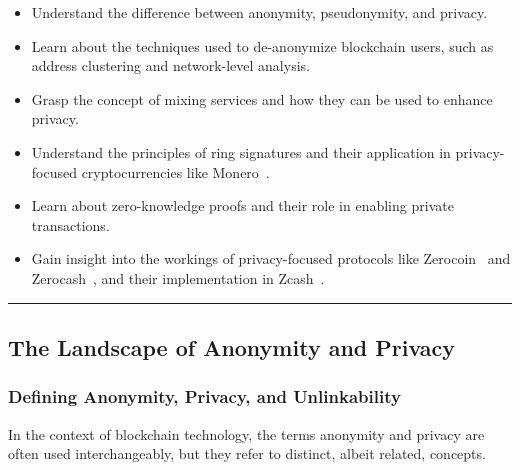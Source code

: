 \begin{itemize}
\tightlist
\item
  Understand the difference between anonymity, pseudonymity, and
  privacy.
\item
  Learn about the techniques used to de-anonymize blockchain users, such
  as address clustering and network-level analysis.
\item
  Grasp the concept of mixing services and how they can be used to
  enhance privacy.
\item
  Understand the principles of ring signatures and their application in
  privacy-focused cryptocurrencies like Monero~\cite{moser2017empirical}.
\item
  Learn about zero-knowledge proofs and their role in enabling private
  transactions.
\item
  Gain insight into the workings of privacy-focused protocols like
  Zerocoin~\cite{miers2013zerocoin} and Zerocash~\cite{sasson2014zerocash}, and their implementation in Zcash~\cite{kappos2018empirical}.
\end{itemize}

\begin{center}\rule{0.5\linewidth}{0.5pt}\end{center}

\subsection{The Landscape of Anonymity and
Privacy}\label{section-1-the-landscape-of-anonymity-and-privacy}

\subsubsection{Defining Anonymity, Privacy, and
Unlinkability}\label{defining-anonymity-privacy-and-unlinkability}

In the context of blockchain technology, the terms anonymity and privacy
are often used interchangeably, but they refer to distinct, albeit
related, concepts.
%

